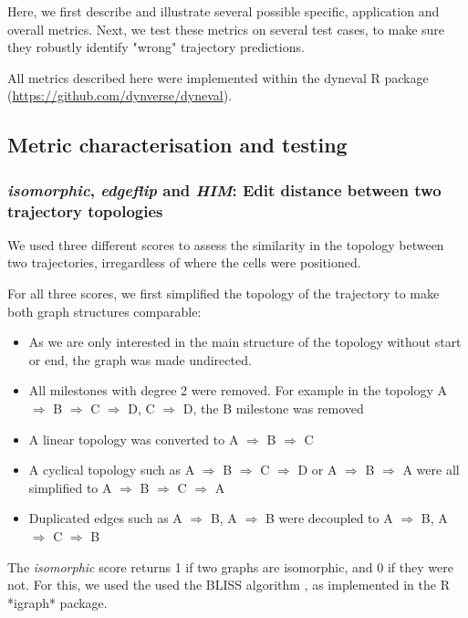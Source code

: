 Here, we first describe and illustrate several possible specific, application and overall metrics. Next, we test these metrics on several test cases, to make sure they robustly identify "wrong" trajectory predictions.

All metrics described here were implemented within the dyneval R package (\url{https://github.com/dynverse/dyneval}).

\subsection{Metric characterisation and testing}

\subsubsection{\textit{isomorphic}, \textit{edgeflip} and \textit{HIM}: Edit distance between two trajectory topologies}

We used three different scores to assess the similarity in the topology between two trajectories, irregardless of where the cells were positioned.

For all three scores, we first simplified the topology of the trajectory to make both graph structures comparable:

\begin{itemize}
	\item As we are only interested in the main structure of the topology without start or end, the graph was made undirected.
	\item All milestones with degree 2 were removed. For example in the topology A $\Rightarrow$ B $\Rightarrow$ C $\Rightarrow$ D, C $\Rightarrow$ D, the B milestone was removed
	\item A linear topology was converted to A $\Rightarrow$ B $\Rightarrow$ C
	\item A cyclical topology such as A $\Rightarrow$ B $\Rightarrow$ C $\Rightarrow$ D or A $\Rightarrow$ B $\Rightarrow$ A were all simplified to A $\Rightarrow$ B $\Rightarrow$ C $\Rightarrow$ A
	\item Duplicated edges such as A $\Rightarrow$ B, A $\Rightarrow$ B were decoupled to A $\Rightarrow$ B, A $\Rightarrow$ C $\Rightarrow$ B
\end{itemize}

The \textit{isomorphic} score returns 1 if two graphs are isomorphic, and 0 if they were not. For this, we used the used the BLISS algorithm \cite{junttila_engineeringefficientcanonical_2007}, as implemented in the R *igraph* package.

